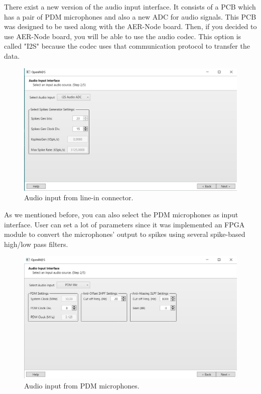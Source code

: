 There exist a new version of the audio input interface. It consists of a PCB which has a pair of PDM microphones and also a new ADC for audio signals. This PCB was designed to be used along with the AER-Node board. Then, if you decided to use AER-Node board, you will be able to use the audio codec. This option is called "I2S" because the codec uses that communication protocol to transfer the data.

\begin{figure}[H]
\centering
\includegraphics[width=1\textwidth]{images/Img17_S2_SelectInput_2.PNG}
\caption{\label{fig:OpenNAS_s2_i2s}Audio input from line-in connector.}
\end{figure}

As we mentioned before, you can also select the PDM microphones as input interface. User can set a lot of parameters since it was implemented an FPGA module to convert the microphones' output to spikes using several spike-based high/low pass filters.

\begin{figure}[H]
\centering
\includegraphics[width=1\textwidth]{images/Img18_S2_SelectInput_3.PNG}
\caption{\label{fig:OpenNAS_s2_pdm}Audio input from PDM microphones.}
\end{figure}

